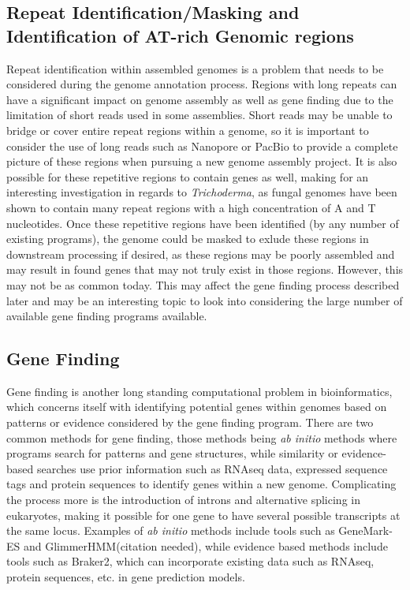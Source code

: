 \documentclass[12pt]{article}
\begin{document}
\subsection{Repeat Identification/Masking and Identification of AT-rich Genomic regions}
Repeat identification within assembled genomes is a problem that
needs to be considered during the genome annotation process. Regions
with long repeats can have a significant impact on genome assembly as
well as gene finding due to the limitation of short reads used in some
assemblies\cite{Repeats}. Short reads may be unable to bridge or cover
entire repeat regions within a genome, so it is important to consider
the use of long reads such as Nanopore or PacBio to provide a complete
picture of these regions when pursuing a new genome assembly
project. It is also possible for these repetitive regions to contain
genes as well, making for an interesting investigation in regards to
\textit{Trichoderma}, as fungal genomes have been shown to contain
many repeat regions with a high concentration of A and T
nucleotides\cite{fungalrepeats}. Once these repetitive regions have
been identified (by any number of existing programs), the genome could
be masked to exlude these regions in downstream processing if desired,
as these regions may be poorly assembled and may result in found genes
that may not truly exist in those regions. However, this may not be as
common today\cite{dontMask}. This may affect the gene finding process
described later and may be an interesting topic to look into
considering the large number of available gene finding programs
available.

\subsection{Gene Finding}
Gene finding is another long standing computational problem in
bioinformatics, which concerns itself with identifying potential genes
within genomes based on patterns or evidence considered by the gene
finding program. There are two common methods for gene finding, those
methods being \textit{ab initio} methods where programs search for
patterns and gene structures, while similarity or evidence-based
searches use prior information such as RNAseq data, expressed sequence
tags and protein sequences to identify genes within a new
genome\cite{GeneFinding}. Complicating the process more is the
introduction of introns and alternative splicing in eukaryotes, making
it possible for one gene to have several possible transcripts at the
same locus. Examples of \textit{ab initio} methods include tools such
as GeneMark-ES\cite{GeneMarkES} and GlimmerHMM(citation needed), while
evidence based methods include tools such as Braker2\cite{Braker2},
which can incorporate existing data such as RNAseq, protein sequences,
etc. in gene prediction models.
\end{document}
